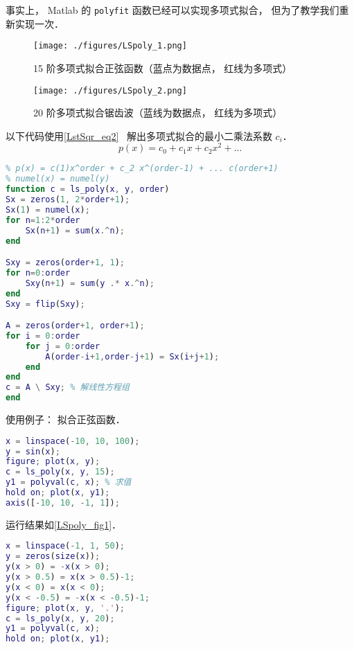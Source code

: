 

事实上， Matlab 的 \verb|polyfit| 函数已经可以实现多项式拟合， 但为了教学我们重新实现一次．
\begin{figure}[ht]
\centering
\texttt{[image: ./figures/LSpoly\_1.png]}
\caption{15 阶多项式拟合正弦函数（蓝点为数据点， 红线为多项式）} \label{LSpoly_fig1}
\end{figure}

\begin{figure}[ht]
\centering
\texttt{[image: ./figures/LSpoly\_2.png]}
\caption{20 阶多项式拟合锯齿波（蓝线为数据点， 红线为多项式）} \label{LSpoly_fig2}
\end{figure}

以下代码使用\autoref{LstSqr_eq2}~ 解出多项式拟合的最小二乘法系数 $c_i$．
\begin{equation}
p(x) = c_0 + c_1 x + c_2 x^2 + \dots
\end{equation}

\begin{lstlisting}[language=matlab, caption=ls_poly.m]
% 多项式最小二乘法拟合
% p(x) = c(1)x^order + c_2 x^(order-1) + ... c(order+1)
% numel(x) = numel(y)
function c = ls_poly(x, y, order)
Sx = zeros(1, 2*order+1);
Sx(1) = numel(x);
for n=1:2*order
    Sx(n+1) = sum(x.^n);
end

Sxy = zeros(order+1, 1);
for n=0:order
    Sxy(n+1) = sum(y .* x.^n);
end
Sxy = flip(Sxy);

A = zeros(order+1, order+1);
for i = 0:order
    for j = 0:order
        A(order-i+1,order-j+1) = Sx(i+j+1);
    end
end
c = A \ Sxy; % 解线性方程组
end
\end{lstlisting}

使用例子： 拟合正弦函数．
\begin{lstlisting}[language=matlab, caption=ls_poly_demo.m]
% ls_poly_demo
x = linspace(-10, 10, 100);
y = sin(x);
figure; plot(x, y);
c = ls_poly(x, y, 15);
y1 = polyval(c, x); % 求值
hold on; plot(x, y1);
axis([-10, 10, -1, 1]);
\end{lstlisting}
运行结果如\autoref{LSpoly_fig1}．

\begin{lstlisting}[language=matlab, caption=ls_poly_demo2.m]
% ls_poly_demo2
x = linspace(-1, 1, 50);
y = zeros(size(x));
y(x > 0) = -x(x > 0);
y(x > 0.5) = x(x > 0.5)-1;
y(x < 0) = x(x < 0);
y(x < -0.5) = -x(x < -0.5)-1;
figure; plot(x, y, '.');
c = ls_poly(x, y, 20);
y1 = polyval(c, x);
hold on; plot(x, y1);
\end{lstlisting}
